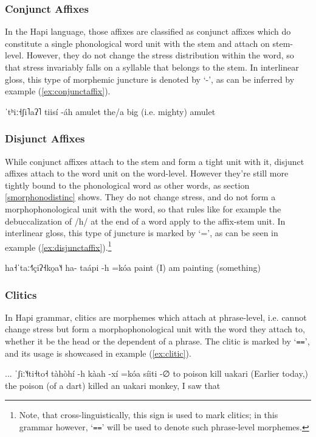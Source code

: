 \documentclass[a4paper, 12pt, oneside]{memoir}
\begin{document}
\subsubsection{Conjunct Affixes}
In the Hapi language, those affixes are classified as conjunct affixes which do constitute a single phonological word unit with the stem and attach on stem-level. However, they do not change the stress distribution within the word, so that stress invariably falls on a syllable that belongs to the stem. In interlinear gloss, this type of morphemic juncture is denoted by `-', as can be inferred by example (\ref{ex:conjunctaffix}).
\begin{examples}
\ex \label{ex:conjunctaffix}
\script ˈtʰiː˧ʃi˥aʔ˥
\bits tiisí -áh
\gloss amulet {\Aug}
\tr the/a big (i.e. mighty) amulet
\end{examples}
\subsubsection{Disjunct Affixes}
While conjunct affixes attach to the stem and form a tight unit with it, disjunct affixes attach to the word unit on the word-level. However they're still more tightly bound to the phonological word as other words, as section \ref{smorphonodistinc} shows.  They do not change stress, and do not form a morphophonological unit with the word, so that rules like for example the debuccalization of /h/ at the end of a word apply to the affix-stem unit. In interlinear gloss, this type of juncture is marked by `=', as can be seen in example (\ref{ex:disjunctaffix}).\footnote{Note, that cross-linguistically, this sign is used to mark clitics; in this grammar however, `\texttt{==}' will be used to denote such phrase-level morphemes.}
\begin{examples}
\ex \label{ex:disjunctaffix}
\script ha˧ˈtaː˧˥çiʔ˧ko̯a˥˧
\bits ha- taápi -h =kóa
\gloss {\Antip} paint {\Ff} {\Decl}
\tr (I) am painting (something)
\end{examples}
\subsubsection{Clitics}
In Hapi grammar, clitics are morphemes which attach at phrase-level, i.e. cannot change stress but form a morphophonological unit with the word they attach to, whether it be the head or the dependent of a phrase. The clitic is marked by `\texttt{==}', and its usage is showcased in example (\ref{ex:clitic}).
\begin{examples}
\newbaarucmd{\cl}{\baarujuncture{\texttt{==}}}
\ex \label{ex:clitic}
\script ... ˈʃiː˥˧ti˧to˧
\bits tàhòhí -h kàah -xí =kóa síiti -∅ \cl to
\gloss poison {\Erg} kill {\Rpasto} {\Decl} uakari {\Abs} {\Vis}
\tr (Earlier today,) the poison (of a dart) killed an uakari monkey, I saw that
\end{examples}
\end{document}
